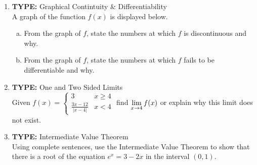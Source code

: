 \documentclass[11pt,fleqn]{article}
\begin{document}
\begin{enumerate}
\item \textbf{TYPE:} Graphical Contintuity \& Differentiability\\
A graph of the function $f(x)$ is displayed
below. 
\begin{multicols}{2}
\begin{center}
\end{center}

\begin{enumerate}[(a)]

  \item From the graph of $f$, state the numbers at which
    $f$ is discontinuous and why.
\vfill
  \item From the graph of $f$, state the numbers at which
    $f$ fails to be differentiable and why. 
\vfill
  \end{enumerate}
\end{multicols}

\item \textbf{TYPE:} One and Two Sided Limits\\
Given $f(x) =
  \begin{cases}
  3 & x \ge 4  \\
    \frac{3x - 12}{|x-4|} & x < 4 
  \end{cases}$ find $\displaystyle \lim_{x \to 4} f(x)$ or explain why this limit
  does not exist. 
  
 \item \textbf{TYPE:} Intermediate Value Theorem\\
 Using complete sentences, use the Intermediate
Value Theorem to show that there is a root of the equation $e^x = 3 -
2x$ in the interval $(0, 1)$. 
  
\end{enumerate}
\end{document}
